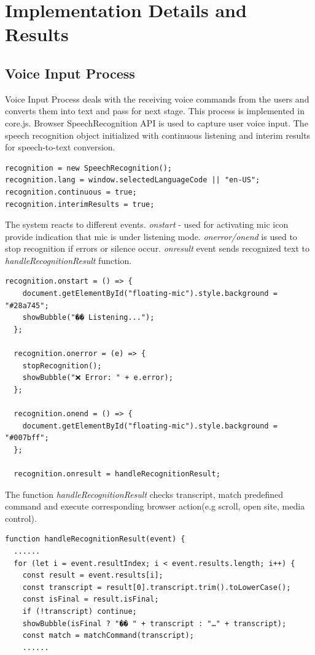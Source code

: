 \section{Implementation Details and Results}

\subsection{Voice Input Process}
Voice Input Process deals with the receiving voice commands from the users and converts them into text and pass for next stage. This process is implemented in core.js. Browser SpeechRecognition API is used to capture user voice input. The speech recognition object initialized with continuous listening and interim results for speech-to-text conversion.


\begin{verbatim}
recognition = new SpeechRecognition();
recognition.lang = window.selectedLanguageCode || "en-US";
recognition.continuous = true;
recognition.interimResults = true;
\end{verbatim}
The system reacts to different events. \textit{onstart} - used for activating mic icon provide indication that mic is under listening mode. \textit{onerror/onend} is used to stop recognition if errors or silence occur. \textit{onresult} event sends recognized text to \textit{handleRecognitionResult} function.
\begin{verbatim}
recognition.onstart = () => {
    document.getElementById("floating-mic").style.background = "#28a745";
    showBubble("�� Listening...");
  };

  recognition.onerror = (e) => {
    stopRecognition();
    showBubble("❌ Error: " + e.error);
  };

  recognition.onend = () => {
    document.getElementById("floating-mic").style.background = "#007bff";
  };

  recognition.onresult = handleRecognitionResult;
\end{verbatim}
The function \textit{handleRecognitionResult} checks transcript, match predefined command and execute corresponding browser action(e.g scroll, open site, media control). 
\begin{verbatim}
function handleRecognitionResult(event) {
  ......
  for (let i = event.resultIndex; i < event.results.length; i++) {
    const result = event.results[i];
    const transcript = result[0].transcript.trim().toLowerCase();
    const isFinal = result.isFinal;
    if (!transcript) continue;
    showBubble(isFinal ? "��️ " + transcript : "…" + transcript);
    const match = matchCommand(transcript);
    ......
\end{verbatim}
